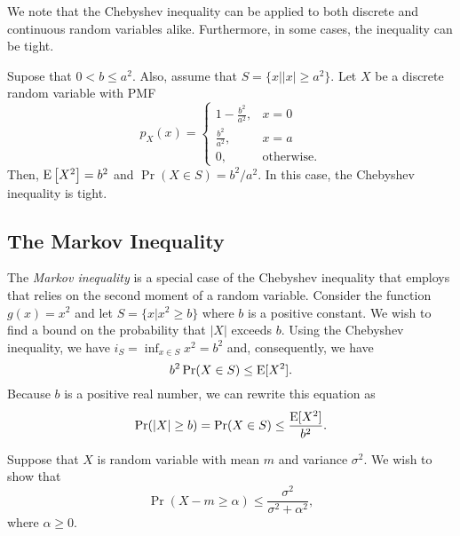 We note that the Chebyshev inequality can be applied to both discrete and continuous random variables alike.
Furthermore, in some cases, the inequality can be tight.

\begin{example}
Supose that $0 < b \leq a^2$.
Also, assume that $S = \{ x | |x| \geq a^2 \}$.
Let $X$ be a discrete random variable with PMF
\begin{equation*}
p_X (x) = \left\{ \begin{array}{ll} 1 - \frac{b^2}{a^2}, & x = 0 \\
\frac{b^2}{a^2}, & x = a \\
0, & \text{otherwise.} \end{array} \right.
\end{equation*}
Then, $\mathrm{E} \left[ X^2 \right] = b^2$ and $\Pr (X \in S) = b^2 / a^2$.
In this case, the Chebyshev inequality is tight.
\end{example}

\subsection{The Markov Inequality}

The \emph{Markov inequality} is a special case of the Chebyshev inequality that employs that relies on the second moment of a random variable. 
Consider the function  $g(x) = x^2$ and let $S = \{ x | x^2 \geq b \}$ where $b$ is a positive constant.
We wish to find a bound on the probability that $|X|$ exceeds $b$.
Using the Chebyshev inequality, we have $i_S = \inf_{x \in S} x^2 = b^2$ and, consequently, we have
\begin{equation*}
b^2 \Pr (X \in S) \leq \mathrm{E} [X^2] .
\end{equation*}
Because $b$ is a positive real number, we can rewrite this equation as
\begin{equation*}
\Pr (|X| \geq b) = \Pr (X \in S) \leq \frac{\mathrm{E} [X^2]}{b^2} .
\end{equation*}


\newpage

\begin{example}
Suppose that $X$ is random variable with mean $m$ and variance $\sigma^2$.
We wish to show that
\begin{equation*}
\Pr ( X - m \geq \alpha ) \leq \frac{\sigma^2}{\sigma^2 + \alpha^2},
\end{equation*}
where $\alpha \geq 0$.
\end{example}


